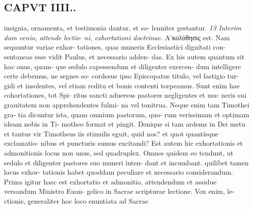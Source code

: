 \documentclass{article}
\begin{document}
\begin{pages}
\section*{CAPVT  IIII.. }
\marginpar{[ p.231 ]}insignia, ornamenta, et testimonia dantur, et so- lenniter gestantur. \textit{13 Interim dum venio, attende lectio-} \textit{ni, exhortationi doctrinae.} Α’κολύθησις est. Nam sequuntur variae exhor- tationes, quas muneris Ecclesiastici dignitati con- sentaneas esse vidit Paulus, et necessario adden- das. Ex his autem quantum sit hoc onus, quam- que sedulo capessendum et diligenter exercen- dum intelligere certe debemus, ne segnes so- cordesue ipso Episcopatus titulo, vel fastigio tur- gidi et insolentes, vel etiam reditu et bonis contenti torpeamus. Sunt enim hae cohortationes, tot Spi- ritus sancti aduersus pastores negligentes et mu- neris sui grauitatem non apprehendentes fulmi- na vel tonitrua. Neque enim tam Timothei gra- tia dicuntur ista, quam omnium pastorum, quo- rum verissimam et optimam ideam nobis in Ti- motheo format et pingit. Denique si tam ardems in Dei metu et tantus vir Timotheus iis stimulis eguit, quid nos? et quot quantísque exclamatio- nibus et puncturis sumus excitandi? Est autem hic exhortationis et admonitionis locus non unus, sed quadruplex. Omnes quidem eo tendunt, ut sedulo et diligenter pastores suo muneri inten- dant et incumbant. quilibet tamen locus exhor- tationis habet quoddam peculiare et necessario considerandum. Prima igitur haec est exhortatio et admonitio, attendendum et assidue versandum Ministro Euan- gelico in Sacrae scripturae lectione. Vox enim, le- ctionis, generaliter hoc loco enuntiata ad Sacrae 

\end{pages}
\end{document}
